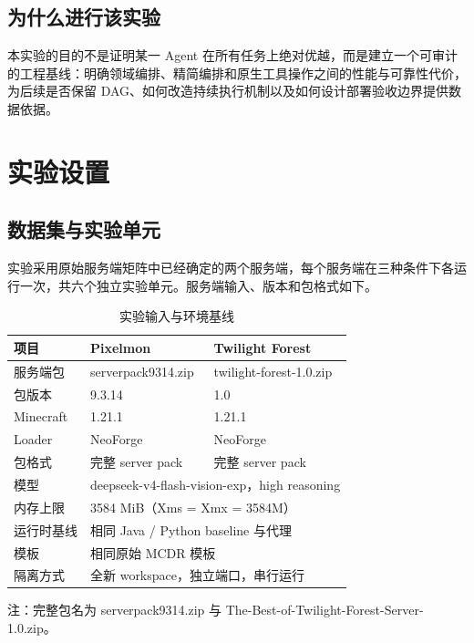 \documentclass[UTF8,a4paper,11pt]{ctexart}
\newcommand{\pixelmon}{Pixelmon}
\newcommand{\twilight}{Twilight Forest}
\begin{document}
\subsection{为什么进行该实验}
本实验的目的不是证明某一 Agent 在所有任务上绝对优越，而是建立一个可审计的工程基线：明确领域编排、精简编排和原生工具操作之间的性能与可靠性代价，为后续是否保留 DAG、如何改造持续执行机制以及如何设计部署验收边界提供数据依据。

\section{实验设置}

\subsection{数据集与实验单元}
实验采用原始服务端矩阵中已经确定的两个服务端，每个服务端在三种条件下各运行一次，共六个独立实验单元。服务端输入、版本和包格式如下。

\begin{table}[H]
\centering
\caption{实验输入与环境基线}
\label{tab:setup}
\small
\begin{tabular}{lll}
\toprule
项目 & \pixelmon{} & \twilight{} \\
\midrule
服务端包 & serverpack9314.zip & twilight-forest-1.0.zip \\
包版本 & 9.3.14 & 1.0 \\
Minecraft & 1.21.1 & 1.21.1 \\
Loader & NeoForge & NeoForge \\
包格式 & 完整 server pack & 完整 server pack \\
模型 & \multicolumn{2}{l}{deepseek-v4-flash-vision-exp，high reasoning} \\
内存上限 & \multicolumn{2}{l}{3584 MiB（Xms = Xmx = 3584M）} \\
运行时基线 & \multicolumn{2}{l}{相同 Java / Python baseline 与代理} \\
模板 & \multicolumn{2}{l}{相同原始 MCDR 模板} \\
隔离方式 & \multicolumn{2}{l}{全新 workspace，独立端口，串行运行} \\
\bottomrule
\end{tabular}
\par\smallskip
{\footnotesize 注：完整包名为 serverpack9314.zip 与 The-Best-of-Twilight-Forest-Server-1.0.zip。}
\end{table}
\end{document}
